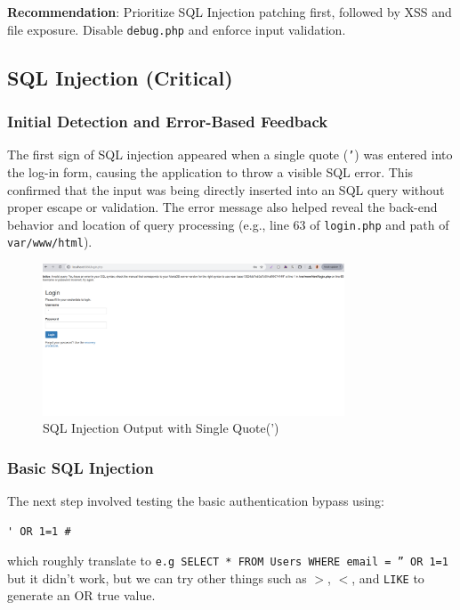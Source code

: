 \documentclass[12pt]{article}
\begin{document}
\noindent \textbf{Recommendation}: Prioritize SQL Injection patching first, followed by XSS and file exposure. Disable \texttt{debug.php} and enforce input validation.
\subsection{SQL Injection (Critical)}

\subsubsection{Initial Detection and Error-Based Feedback}
The first sign of SQL injection appeared when a single quote (\texttt{'}) was entered into the log-in form, causing the application to throw a visible SQL error. This confirmed that the input was being directly inserted into an SQL query without proper escape or validation. The error message also helped reveal the back-end behavior and location of query processing (e.g., line 63 of \texttt{login.php} and path of \texttt{var/www/html}).

\begin{figure}[h!]
\centering
\includegraphics[width=0.8\textwidth]{PT1.png}
\caption{SQL Injection Output with Single Quote(')}
\label{fig:sql_injection}
\end{figure}

\FloatBarrier

\subsubsection{Basic SQL Injection}
The next step involved testing the basic authentication bypass using:
\begin{verbatim}
' OR 1=1 #
\end{verbatim}
which roughly translate to \texttt{e.g SELECT * FROM Users WHERE email = '' OR 1=1} but it didn't work, but we can try other things such as $>$, $<$, and \texttt{LIKE} to generate an OR true value.
\end{document}
